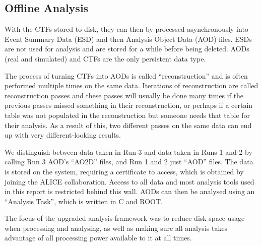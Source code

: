 \subsection{Offline Analysis}
With the CTFs stored to disk, they can then by processed asynchronously into Event Summary Data (ESD) and then Analysis Object Data (AOD) files. ESDs are not used for analysis and are stored for a while before being deleted. AODs (real and simulated) and CTFs are the only persistent data type. 

The process of turning CTFs into AODs is called ``reconstruction'' and is often performed multiple times on the same data. Iterations of reconstruction are called reconstruction passes and these passes will usually be done many times if the previous passes missed something in their reconstruction, or perhaps if a certain table was not populated in the reconstruction but someone needs that table for their analysis. As a result of this, two different passes on the same data can end up with very different-looking results. 

We distinguish between data taken in Run 3 and data taken in Runs 1 and 2 by calling Run 3 AOD's ``AO2D'' files, and Run 1 and 2 just ``AOD'' files. The data is stored on the  system, requiring a certificate to access, which is obtained by joining the ALICE collaboration. Access to all data and most analysis tools used in this report is restricted behind this wall. AODs can then be analysed using an ``Analysis Task'', which is written in C\OldTexttt{++} and ROOT. 





The focus of the upgraded analysis framework was to reduce disk space usage when processing and analysing, as well as making sure all analysis takes advantage of all processing power available to it at all times.